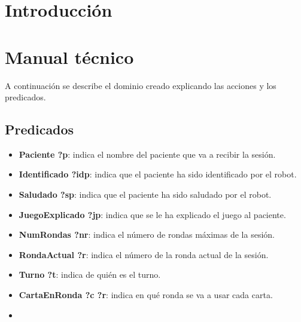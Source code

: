 \documentclass{uc3mpracticas}
\begin{document}
  \frontmatter



  \vspace{55mm}


  \newpage

  \tableofcontents

  \newpage

  \mainmatter

  \section{Introducción}


  \section{Manual técnico}

  A continuación se describe el dominio creado explicando las acciones y los predicados.

  \subsection{Predicados}


  \begin{itemize}
    \item \textbf{Paciente ?p}: indica el nombre del paciente que va a recibir la sesión.
    \item \textbf{Identificado ?idp}: indica que el paciente ha sido identificado por el robot.
    \item \textbf{Saludado ?sp}: indica que el paciente ha sido saludado por el robot.
    \item \textbf{JuegoExplicado ?jp}: indica que se le ha explicado el juego al paciente.
    \item \textbf{NumRondas ?nr}: indica el número de rondas máximas de la sesión.
    \item \textbf{RondaActual ?r}: indica el número de la ronda actual de la sesión.
    \item \textbf{Turno ?t}: indica de quién es el turno.
    \item \textbf{CartaEnRonda ?c ?r}: indica en qué ronda se va a usar cada carta.
    \item \textbf{}
  \end{itemize}
\end{document}
